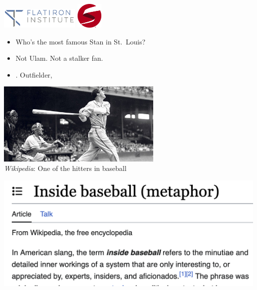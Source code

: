 \documentclass[9pt]{report}
\begin{document}
\sf%
\mbox{ }
\\[12pt]
\spc{{\LARGE\bfseries \color{MidnightBlue}{Orders of Magnitude:}}}
\\[8pt]
\spc{\Large\bfseries \color{MidnightBlue}{Stan Algorithms and Engineering}}
\\[36pt]
\noindent 
\spc{\large\bfseries \color{MidnightBlue}{Bob Carpenter}}
\\[2pt]
\\[2pt]
\vfill 
\noindent 
{}
\hfill
\includegraphics[width=1.5in]{img/flatiron_logo.png}
\includegraphics[width=0.5in]{img/stan-logo.png}

\begin{itemize}
\item Who's the most famous Stan in St.\ Louis?
\end{itemize}

\begin{itemize}
\item Not Ulam. Not a stalker fan.
\item {}.  Outfielder, 
\end{itemize}
\begin{center}
  \spc\includegraphics[width=0.6\textwidth]{img/stan-the-man.jpeg}
  \\
  {\small {\slshape Wikipedia}: One of the  hitters in baseball}
  \end{center}


  \sld{}
  \vspace*{-24pt}
\begin{center}
    \spc\includegraphics[width=\textwidth]{img/inside-baseball.png}
  \end{center}
  \vfill
  \null
\end{document}
